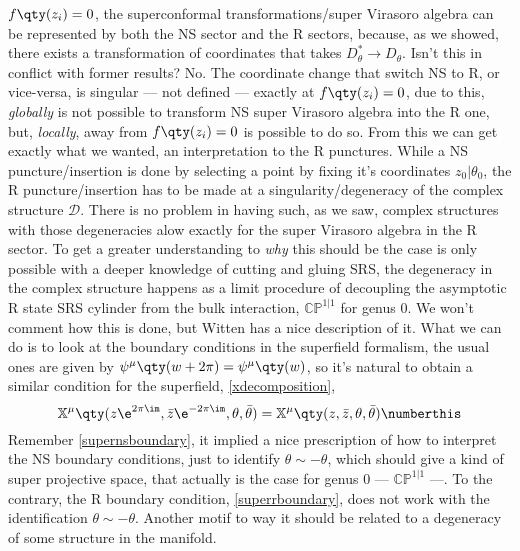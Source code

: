 $f\qty(z_i)=0$, the superconformal transformations/super Virasoro algebra can be represented by both the NS sector and the R sectors, because, 
as we showed, there exists a transformation of coordinates that takes $D^\ast_\theta\rightarrow D_\theta$. Isn't this in conflict with former 
results? No. The coordinate change that switch NS to R, or vice-versa, is singular --- not defined --- exactly at $f\qty(z_i)=0$, due to 
this, \textit{globally} is not possible to transform NS super Virasoro algebra into the R one, but, \textit{locally}, away from $f\qty(z_i)=0$ 
is possible to do so. From this we can get exactly what we wanted, an interpretation to the R punctures. While a NS puncture/insertion is done 
by selecting a point by fixing it's coordinates $z_0|\theta_0$, the R puncture/insertion has to be made at a singularity/degeneracy of 
the complex structure $\mathcal D$. There is no problem in having such, as we saw, complex structures with those degeneracies 
alow exactly for the super Virasoro algebra in the R sector. To get a greater understanding to \textit{why} this should be 
the case is only possible with a deeper knowledge of cutting and gluing SRS, the degeneracy in the complex structure 
happens as a limit procedure of decoupling the asymptotic R state SRS cylinder from the bulk interaction, $\mathbb {CP}^{1|1}$  for 
genus $0$. We won't comment how this is done, but Witten has a nice description of it. What we can do 
is to look at the boundary conditions in the superfield formalism, the usual ones are given by $\psi^\mu\qty(w+2\pi)=\psi^\mu\qty(w)$, 
so it's natural to obtain a similar condition for the superfield, \cref{xdecomposition},
\[\mathbb X^\mu\qty(z\e^{2\pi\im},\bar z\e^{-2\pi\im},\theta,\bar\theta)=\mathbb X^\mu\qty(z,\bar z,\theta,\bar\theta)\numberthis\label{superrboundary}\]
Remember \cref{supernsboundary}, it implied a nice prescription of how to interpret the NS boundary conditions, 
just to identify $\theta\sim-\theta$, which should give a kind of super projective space, that actually is the 
case for genus $0$ --- $\mathbb{CP}^{1|1}$ ---. To the contrary, the R boundary condition, \cref{superrboundary}, 
does not work with the identification $\theta\sim-\theta$. Another motif to way it should be related to a 
degeneracy of some structure in the manifold.